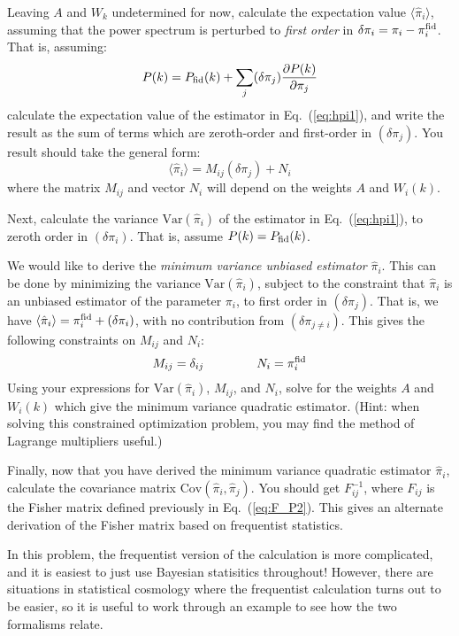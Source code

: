 \documentclass[aps,prd,superscriptaddress,groupedaddress,nofootinbib,nobibnotes]{revtex4}
\newcommand{\be}{\begin{equation}}
\newcommand{\ee}{\end{equation}}
\def\Var{\mbox{Var}}
\def\hpi{{\hat\pi}}
\begin{document}
\begin{enumerate}
  Leaving $A$ and $W_k$ undetermined for now, calculate the expectation value $\langle \hpi_i \rangle$, assuming that
  the power spectrum is perturbed to {\em first order} in $\delta\pi_i = \pi_i - \pi_i^{\rm fid}$.  That is, assuming:
\be
  P(k) = P_{\rm fid}(k) + \sum_j (\delta \pi_j) \frac{\partial P(k)}{\partial\pi_j}
\ee
  calculate the expectation value of the estimator in Eq.~(\ref{eq:hpi1}), and write the result as the sum of terms
  which are zeroth-order and first-order in $(\delta\pi_j)$.  You result should take the general form:
\be
  \langle \hpi_i \rangle = M_{ij} (\delta \pi_j) + N_i
\ee
  where the matrix $M_{ij}$ and vector $N_i$ will depend on the weights $A$ and $W_i(k)$.

  Next, calculate the variance $\Var(\hpi_i)$ of the estimator in Eq.~(\ref{eq:hpi1}), to zeroth order in $(\delta\pi_i)$.
  That is, assume $P(k) = P_{\rm fid}(k)$.

  We would like to derive the {\em minimum variance unbiased estimator} $\hpi_i$.
  This can be done by minimizing the variance $\Var(\hpi_i)$, subject to the constraint that $\hpi_i$ is an unbiased estimator
  of the parameter $\pi_i$, to first order in $(\delta\pi_j)$.
  That is, we have $\langle \hpi_i \rangle = \pi_i^{\rm fid} + (\delta\pi_i)$, with no contribution from $(\delta\pi_{j \ne i})$.
  This gives the following constraints on $M_{ij}$ and $N_i$:
\be
 M_{ij} = \delta_{ij}
   \hspace{1.5cm}
 N_i = \pi_i^{\rm fid}
\ee
  Using your expressions for $\Var(\hpi_i)$, $M_{ij}$, and $N_i$, solve for the weights $A$ and $W_i(k)$ which
  give the minimum variance quadratic estimator.  (Hint: when solving this constrained optimization problem, you
  may find the method of Lagrange multipliers useful.)

  Finally, now that you have derived the minimum variance quadratic estimator $\hpi_i$,
  calculate the covariance matrix $\mbox{Cov}(\hpi_i, \hpi_j)$.  You should get $F^{-1}_{ij}$,
  where $F_{ij}$ is the Fisher matrix defined previously in Eq.~(\ref{eq:F_P2}).  This gives
  an alternate derivation of the Fisher matrix based on frequentist statistics.  

  In this problem, the frequentist version of the calculation is more complicated,
  and it is easiest to just use Bayesian statisitics throughout!  However, there are
  situations in statistical cosmology where the frequentist calculation turns out to be
  easier, so it is useful to work through an example to see how the two formalisms relate.
\end{enumerate}
\end{document}
